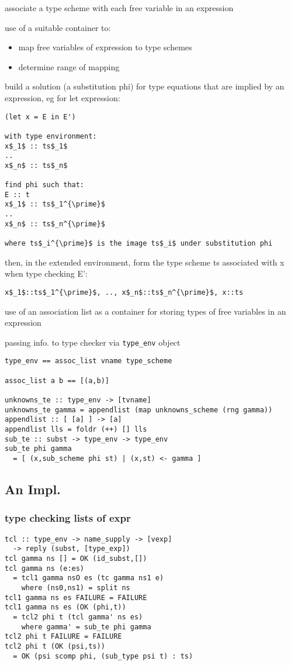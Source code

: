 \documentclass[8pt]{extarticle}
\begin{document}
\begin{multicols*}{2}
associate a type scheme with each free variable in an expression

use of a suitable container to:
\begin{itemize}
\item map free variables of expression to type schemes
\item determine range of mapping
\end{itemize}

build a solution (a substitution phi) for type equations that are implied by an expression, eg for let expression:
\begin{lstlisting}
(let x = E in E')

with type environment:
x$_1$ :: ts$_1$
..
x$_n$ :: ts$_n$

find phi such that:
E :: t
x$_1$ :: ts$_1^{\prime}$
..
x$_n$ :: ts$_n^{\prime}$

where ts$_i^{\prime}$ is the image ts$_i$ under substitution phi
\end{lstlisting}

then, in the extended environment, form the type scheme ts associated with x when type checking E':
\begin{lstlisting}
x$_1$::ts$_1^{\prime}$, .., x$_n$::ts$_n^{\prime}$, x::ts
\end{lstlisting}

use of an association list as a container for storing types of free variables in an expression

passing info. to type checker via \verb|type_env| object

\begin{verbatim}
type_env == assoc_list vname type_scheme

assoc_list a b == [(a,b)]

unknowns_te :: type_env -> [tvname]
unknowns_te gamma = appendlist (map unknowns_scheme (rng gamma))
appendlist :: [ [a] ] -> [a]
appendlist lls = foldr (++) [] lls
sub_te :: subst -> type_env -> type_env
sub_te phi gamma
  = [ (x,sub_scheme phi st) | (x,st) <- gamma ]
\end{verbatim}

\vfill\null
\columnbreak

\subsection{An Impl.}

\subsubsection{type checking lists of expr}
\begin{verbatim}
tcl :: type_env -> name_supply -> [vexp]
  -> reply (subst, [type_exp])
tcl gamma ns [] = OK (id_subst,[])
tcl gamma ns (e:es)
  = tcl1 gamma nsO es (tc gamma ns1 e)
    where (ns0,ns1) = split ns
tcl1 gamma ns es FAILURE = FAILURE
tcl1 gamma ns es (OK (phi,t))
  = tcl2 phi t (tcl gamma' ns es)
    where gamma' = sub_te phi gamma
tcl2 phi t FAILURE = FAILURE
tcl2 phi t (OK (psi,ts))
  = OK (psi scomp phi, (sub_type psi t) : ts)
\end{verbatim}


\end{multicols*}
\end{document}
